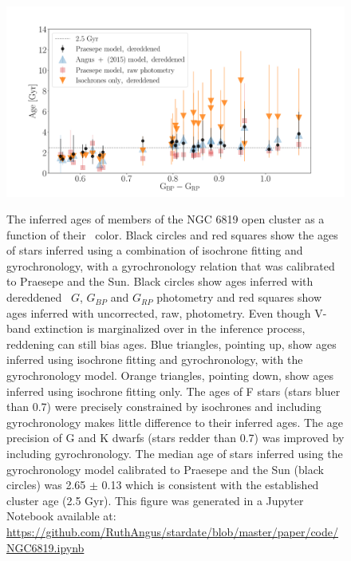 \begin{figure}
  \caption{
    The inferred ages of members of the NGC 6819 open cluster as a function of
    their \gcolor\ color.
    Black circles and red squares show the ages of stars inferred using a
    combination of isochrone fitting and gyrochronology, with a gyrochronology
    relation that was calibrated to Praesepe and the Sun.
    Black circles show ages inferred with dereddened \gaia\ $G$, $G_{BP}$ and
    $G_{RP}$ photometry and red squares show ages inferred with uncorrected,
    raw, photometry.
    Even though V-band extinction is marginalized over in the inference
    process, reddening can still bias ages.
    Blue triangles, pointing up, show ages inferred using isochrone fitting
    and gyrochronology, with the \citet{angus2015} gyrochronology model.
    Orange triangles, pointing down, show ages inferred using isochrone
    fitting only.
    The ages of F stars (stars bluer than 0.7) were precisely constrained by
    isochrones and including gyrochronology makes little difference to their
    inferred ages.
    The age precision of G and K dwarfs (stars redder than 0.7) was improved
    by including gyrochronology.
    The median age of stars inferred using the gyrochronology model
    calibrated to Praesepe and the Sun (black circles) was 2.65 $\pm$ 0.13
    which is consistent with the established cluster age (2.5 Gyr).
    This figure was generated in a Jupyter Notebook available at:
    \url{https://github.com/RuthAngus/stardate/blob/master/paper/code/NGC6819.ipynb}
}
  \centering
    \includegraphics[width=1\textwidth]{NGC6819_results}
\label{fig:NGC6819_results}
\end{figure}

